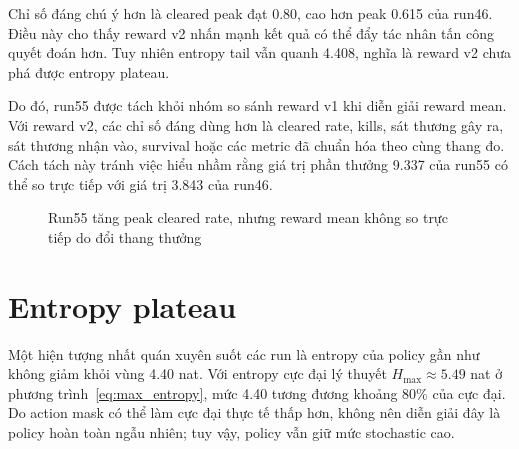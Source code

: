 Chỉ số đáng chú ý hơn là cleared peak đạt 0.80, cao hơn peak 0.615 của run46. Điều này cho thấy reward v2 nhấn mạnh kết quả có thể đẩy tác nhân tấn công quyết đoán hơn. Tuy nhiên entropy tail vẫn quanh 4.408, nghĩa là reward v2 chưa phá được entropy plateau.

Do đó, run55 được tách khỏi nhóm so sánh reward v1 khi diễn giải reward mean. Với reward v2, các chỉ số đáng dùng hơn là cleared rate, kills, sát thương gây ra, sát thương nhận vào, survival hoặc các metric đã chuẩn hóa theo cùng thang đo. Cách tách này tránh việc hiểu nhầm rằng giá trị phần thưởng 9.337 của run55 có thể so trực tiếp với giá trị 3.843 của run46.

\begin{figure}[H]
    \centering
    \caption{Run55 tăng peak cleared rate, nhưng reward mean không so trực tiếp do đổi thang thưởng}
    \label{fig:reward_v2_clear_peak}
\end{figure}

\section{Entropy plateau}

Một hiện tượng nhất quán xuyên suốt các run là entropy của policy gần như không giảm khỏi vùng 4.40 nat. Với entropy cực đại lý thuyết $H_{\max}\approx 5.49$ nat ở phương trình~\ref{eq:max_entropy}, mức 4.40 tương đương khoảng 80\% của cực đại. Do action mask có thể làm cực đại thực tế thấp hơn, không nên diễn giải đây là policy hoàn toàn ngẫu nhiên; tuy vậy, policy vẫn giữ mức stochastic cao.

